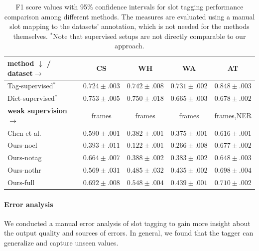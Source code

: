 \begin{table}
        \centering
        \small
        \begin{tabular}{l|c|c|c|c}
        \hline
         \textbf{method} $\downarrow$ / \textbf{dataset}$ \rightarrow$ &  \textbf{CS} & \textbf{WH} & \textbf{WA} & \textbf{AT} \\
         \hline
        Tag-supervised$^\ast$ & $0.724 \pm .003 $ & $\pmb{0.742} \pm .008$ & $\pmb{0.731} \pm .002$ & $\pmb{0.848} \pm .003$ \\
         Dict-supervised$^\ast$ & $\pmb{0.753} \pm .005 $ & $\pmb{0.750} \pm .018$ & $0.665 \pm .003$ & $0.678 \pm .002$ \\\hline
        \bf weak supervision $\rightarrow$ & frames & frames & frames &  frames,NER \\\hline
         Chen et al. & $0.590 \pm .001 $ & $0.382 \pm .001$ & $0.375 \pm .001$ & $0.616 \pm .001$  \\\hdashline[0.5pt/2pt]
         Ours-nocl & $0.393 \pm .011 $ & $0.122 \pm .001$ & $0.266 \pm .008 $ & $ 0.677 \pm .002$ \\
         Ours-notag & $0.664 \pm .007$ & $0.388 \pm .002$ & $0.383 \pm .002$ & $ 0.648 \pm .003$ \\
         Ours-nothr & $0.569 \pm .031$ & $0.485 \pm .032$ & $0.435 \pm .002 $ & $0.698 \pm .004$\\
         Ours-full & $\pmb{0.692} \pm .008$ & $\pmb{0.548} \pm .004$ & $\pmb{0.439} \pm .001$ & $\pmb{0.710} \pm .002$ \\
         \hline
        \end{tabular}
                 
        \caption{F1 score values with 95\% confidence intervals for slot tagging performance comparison among different methods. The measures are evaluated using a manual slot mapping to the datasets' annotation, which is not needed for the methods themselves. $^\ast$Note that supervised setups are not directly comparable to our approach.
        \label{table:slotfilling}
        }
\end{table}

\paragraph{Error analysis}
We conducted a manual error analysis of slot tagging to gain more insight about the output quality and sources of errors.
In general, we found that the tagger can generalize and capture unseen values.

